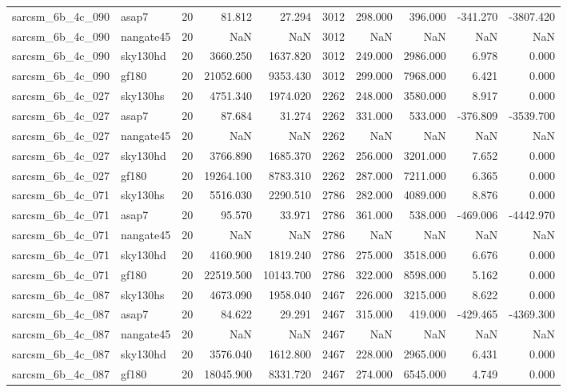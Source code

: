 \begin{longtable}{llrrrrrrrr}
sarcsm\_6b\_4c\_090 & asap7 & 20 & 81.812 & 27.294 & 3012 & 298.000 & 396.000 & -341.270 & -3807.420 \\
sarcsm\_6b\_4c\_090 & nangate45 & 20 & NaN & NaN & 3012 & NaN & NaN & NaN & NaN \\
sarcsm\_6b\_4c\_090 & sky130hd & 20 & 3660.250 & 1637.820 & 3012 & 249.000 & 2986.000 & 6.978 & 0.000 \\
sarcsm\_6b\_4c\_090 & gf180 & 20 & 21052.600 & 9353.430 & 3012 & 299.000 & 7968.000 & 6.421 & 0.000 \\
sarcsm\_6b\_4c\_027 & sky130hs & 20 & 4751.340 & 1974.020 & 2262 & 248.000 & 3580.000 & 8.917 & 0.000 \\
sarcsm\_6b\_4c\_027 & asap7 & 20 & 87.684 & 31.274 & 2262 & 331.000 & 533.000 & -376.809 & -3539.700 \\
sarcsm\_6b\_4c\_027 & nangate45 & 20 & NaN & NaN & 2262 & NaN & NaN & NaN & NaN \\
sarcsm\_6b\_4c\_027 & sky130hd & 20 & 3766.890 & 1685.370 & 2262 & 256.000 & 3201.000 & 7.652 & 0.000 \\
sarcsm\_6b\_4c\_027 & gf180 & 20 & 19264.100 & 8783.310 & 2262 & 287.000 & 7211.000 & 6.365 & 0.000 \\
sarcsm\_6b\_4c\_071 & sky130hs & 20 & 5516.030 & 2290.510 & 2786 & 282.000 & 4089.000 & 8.876 & 0.000 \\
sarcsm\_6b\_4c\_071 & asap7 & 20 & 95.570 & 33.971 & 2786 & 361.000 & 538.000 & -469.006 & -4442.970 \\
sarcsm\_6b\_4c\_071 & nangate45 & 20 & NaN & NaN & 2786 & NaN & NaN & NaN & NaN \\
sarcsm\_6b\_4c\_071 & sky130hd & 20 & 4160.900 & 1819.240 & 2786 & 275.000 & 3518.000 & 6.676 & 0.000 \\
sarcsm\_6b\_4c\_071 & gf180 & 20 & 22519.500 & 10143.700 & 2786 & 322.000 & 8598.000 & 5.162 & 0.000 \\
sarcsm\_6b\_4c\_087 & sky130hs & 20 & 4673.090 & 1958.040 & 2467 & 226.000 & 3215.000 & 8.622 & 0.000 \\
sarcsm\_6b\_4c\_087 & asap7 & 20 & 84.622 & 29.291 & 2467 & 315.000 & 419.000 & -429.465 & -4369.300 \\
sarcsm\_6b\_4c\_087 & nangate45 & 20 & NaN & NaN & 2467 & NaN & NaN & NaN & NaN \\
sarcsm\_6b\_4c\_087 & sky130hd & 20 & 3576.040 & 1612.800 & 2467 & 228.000 & 2965.000 & 6.431 & 0.000 \\
sarcsm\_6b\_4c\_087 & gf180 & 20 & 18045.900 & 8331.720 & 2467 & 274.000 & 6545.000 & 4.749 & 0.000 \\

\end{longtable}
